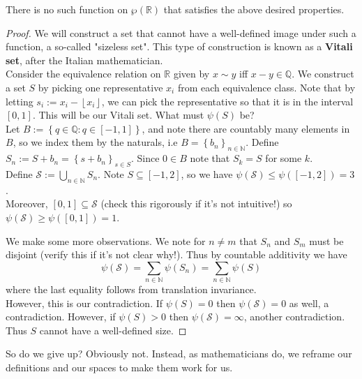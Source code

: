\documentclass[11pt,x11names]{article}
\newcommand{\nn}{\mathbb{N}}
\newcommand{\qq}{\mathbb{Q}}
\newcommand{\rr}{\mathbb{R}}
\newcommand{\cals}{\mathcal{S}}
\newcommand{\set}[1]{\left\{ #1 \right\}}
\newcommand{\floor}[1]{\left\lfloor #1 \right\rfloor}
\begin{document}
\begin{theorem}
There is no such function on $\wp(\rr)$ that satisfies the above desired properties.
\end{theorem}
\begin{proof}
We will construct a set that cannot have a well-defined image under such a function, a so-called "sizeless set". This type of construction is known as a \textbf{Vitali set}, after the Italian mathematician.\\

Consider the equivalence relation on $\rr$ given by $x \sim y$ iff $x - y \in \qq$. We construct a set $S$ by picking one representative $x_i$ from each equivalence class. Note that by letting $s_i := x_i - \floor{x_i}$, we can pick the representative so that it is in the interval $[0, 1]$. This will be our Vitali set. What must $\psi(S)$ be?\\

Let $B := \set{q \in \qq : q \in [-1, 1]}$, and note there are countably many elements in $B$, so we index them by the naturals, i.e $ B = \set{b_n}_{n \in \nn}$. Define $S_n := S + b_n = \set{s + b_n}_{s \in S}$. Since $0 \in B$ note that $S_k = S$ for some $k$.\\

Define $\cals := \bigcup_{n \in \nn} S_n$. Note $S \subseteq [-1, 2]$, so we have $\psi(\cals) \leq \psi([-1, 2]) = 3$.\\
Moreover, $[0, 1] \subseteq \cals$ (check this rigorously if it's not intuitive!) so $\psi(\cals) \geq \psi([0, 1]) = 1$. 

We make some more observations. We note for $n \neq m$ that $S_n$ and $S_m$ must be disjoint (verify this if it's not clear why!). Thus by countable additivity we have
\begin{equation*}
    \psi(\cals) = \sum_{n \in \nn} \psi(S_n) = \sum_{n \in \nn} \psi(S)
\end{equation*}
where the last equality follows from translation invariance.\\

However, this is our contradiction. If $\psi(S) = 0$ then $\psi(\cals) = 0$ as well, a contradiction. However, if $\psi(S) > 0$ then $\psi(\cals) = \infty$, another contradiction. Thus $S$ cannot have a well-defined size.
\end{proof}

So do we give up? Obviously not. Instead, as mathematicians do, we reframe our definitions and our spaces to make them work for us.
\end{document}
